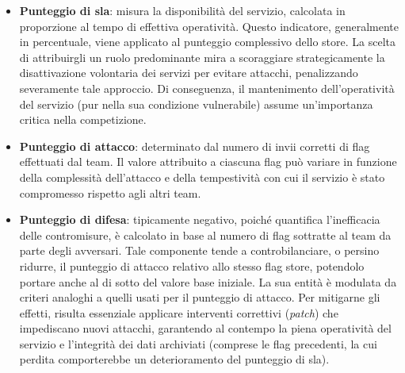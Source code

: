 \begin{itemize}
    \setlength{\itemsep}{2pt}
    \setlength{\parskip}{2pt}
    \item \textbf{Punteggio di \gls{sla}}: misura la disponibilità del servizio, calcolata in proporzione al tempo di effettiva operatività.
    Questo indicatore, generalmente in percentuale, viene applicato al punteggio complessivo dello store. La scelta di attribuirgli un ruolo predominante mira a scoraggiare strategicamente la disattivazione volontaria dei servizi per evitare attacchi, penalizzando severamente tale approccio. Di conseguenza, il mantenimento dell'operatività del servizio (pur nella sua condizione vulnerabile) assume un'importanza critica nella competizione.

    \item \textbf{Punteggio di attacco}: determinato dal numero di invii corretti di flag effettuati dal team. Il valore attribuito a ciascuna flag può variare in funzione della complessità dell'attacco e della tempestività con cui il servizio è stato compromesso rispetto agli altri team.

    \item \textbf{Punteggio di difesa}: tipicamente negativo, poiché quantifica l'inefficacia delle contromisure, è calcolato in base al numero di flag sottratte al team da parte degli avversari. Tale componente tende a controbilanciare, o persino ridurre, il punteggio di attacco relativo allo stesso flag store, potendolo portare anche al di sotto del valore base iniziale. La sua entità è modulata da criteri analoghi a quelli usati per il punteggio di attacco. Per mitigarne gli effetti, risulta essenziale applicare interventi correttivi (\emph{patch}) che impediscano nuovi attacchi, garantendo al contempo la piena operatività del servizio e l'integrità dei dati archiviati (comprese le flag precedenti, la cui perdita comporterebbe un deterioramento del punteggio di \gls{sla}).
\end{itemize}

